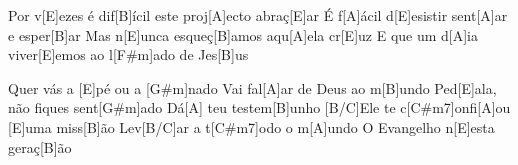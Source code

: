 Por v[E]ezes é dif[B]ícil este proj[A]ecto abraç[E]ar
É f[A]ácil d[E]esistir sent[A]ar e esper[B]ar
Mas n[E]unca esqueç[B]amos aqu[A]ela cr[E]uz
E que um d[A]ia viver[E]emos ao l[F#m]ado de Jes[B]us

\endverse


\beginchorus

Quer vás a [E]pé ou a [G#m]nado
Vai fal[A]ar de Deus ao m[B]undo
Ped[E]ala, não fiques sent[G#m]ado
Dá[A] teu testem[B]unho
[B/C]Ele te c[C#m7]onfi[A]ou [E]uma miss[B]ão
Lev[B/C]ar a t[C#m7]odo o m[A]undo
O Evangelho n[E]esta geraç[B]ão

\endchorus

\endsong
